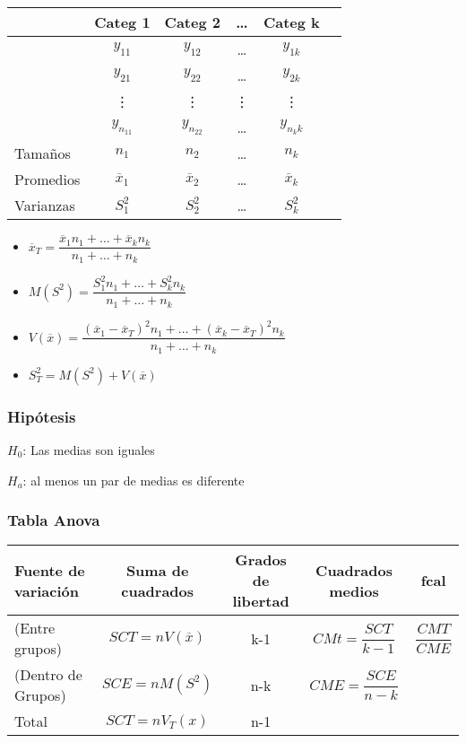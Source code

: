 \begin{tabular}{lccccc}
	\hline
	&Categ 1 & Categ 2 & \dots & Categ k\\
	\hline
	&$y_{11}$ & $y_{12}$ & \dots & $y_{1k}$\\
	&$y_{21}$ & $y_{22}$ & \dots & $y_{2k}$\\
	&\vdots   & \vdots    & \vdots& \vdots\\
	&$y_{n_11}$ & $y_{n_22}$ & \dots & $y_{n_kk}$\\
	\hline
	Tamaños & $n_1$ & $n_2$ & \dots & $n_k$\\
	\hline
	Promedios & $\overline{x}_1$ & $\overline{x}_2$ & \dots & $\overline{x}_k$\\
	\hline
	Varianzas & $S_1^2$ & $S_2^2$ & \dots & $S_k^2$
\end{tabular}

\begin{itemize}
	\item $\overline{x}_T=\dfrac{\overline{x}_1n_1+\dots+\overline{x}_kn_k}{n_1+\dots+n_k}$
	\item $M(S^2)=\dfrac{S^2_1n_1+\dots+S^2_kn_k}{n_1+\dots+n_k}$
	\item $V(\overline{x})=\dfrac{(\overline{x}_1-\overline{x}_T)^2n_1+\dots+(\overline{x}_k-\overline{x}_T)^2n_k}{n_1+\dots+n_k}$
	\item $S_T^2=M(S^2)+V(\overline{x})$
\end{itemize}

\subsubsection{Hipótesis}
$H_0$: Las medias son iguales

$H_a$: al menos un par de medias es diferente

\subsubsection{Tabla Anova}
\begin{tabular}{lcccc}
	\hline
	Fuente de variación & Suma de cuadrados & Grados de libertad & Cuadrados medios & fcal\\
	\hline
	(Entre grupos) & $SCT=nV(\overline{x})$ & k-1 & $CMt=\dfrac{SCT}{k-1}$ & $\dfrac{CMT}{CME}$\\
	(Dentro de Grupos) & $SCE=nM(S^2)$ & n-k & $CME=\dfrac{SCE}{n-k}$ & \\
	\hline
	\hline
	Total & $SCT=nV_T(x)$ & n-1
\end{tabular}


